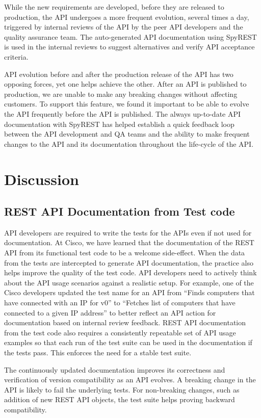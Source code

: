 \documentclass[10pt, conference]{IEEEtran}
\begin{document}
While the new requirements are developed, before they are released to production, the API undergoes a more frequent evolution, several times a day, triggered by internal reviews of the API by the peer API developers and the quality assurance team. The auto-generated API documentation using SpyREST is used in the internal reviews to suggest alternatives and verify API acceptance criteria.

API evolution before and after the production release of the API has two opposing forces, yet one helps achieve the other. After an API is published to production, we are unable to make any breaking changes without affecting customers. To support this feature, we found it important to be able to evolve the API frequently before the API is published. The always up-to-date API documentation with SpyREST has helped establish a quick feedback loop between the API development and QA teams and the ability to make frequent changes to the API and its documentation throughout the life-cycle of the API.


\section{Discussion}

\subsection{REST API Documentation from Test code}
API developers are required to write the tests for the APIs even if not used for documentation. At Cisco, we have learned that the documentation of the REST API from its functional test code to be a welcome side-effect. When the data from the tests are intercepted to generate API documentation, the practice also helps improve the quality of the test code. API developers need to actively think about the API usage scenarios against a realistic setup. For example, one of the Cisco developers updated the test name for an API from ``Finds computers that have connected with an IP for v0'' to ``Fetches list of computers that have connected to a given IP address'' to better reflect an API action for documentation based on internal review feedback. REST API documentation from the test code also requires a consistently repeatable set of API usage examples so that each run of the test suite can be used in the documentation if the tests pass. This enforces the need for a stable test suite.

The continuously updated documentation improves its correctness and verification of version compatibility as an API evolves. A breaking change in the API is likely to fail the underlying tests. For non-breaking changes, such as addition of new REST API objects, the test suite helps proving backward compatibility.
\end{document}
